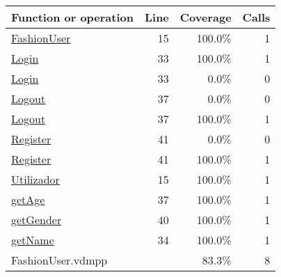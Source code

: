 \begin{longtable}{|l|r|r|r|}
\hline
Function or operation & Line & Coverage & Calls \\
\hline
\hline
\hyperref[FashionUser:15]{FashionUser} & 15&100.0\% & 1 \\
\hline
\hyperref[Login:33]{Login} & 33&100.0\% & 1 \\
\hline
\hyperref[Login:33]{Login} & 33&0.0\% & 0 \\
\hline
\hyperref[Logout:37]{Logout} & 37&0.0\% & 0 \\
\hline
\hyperref[Logout:37]{Logout} & 37&100.0\% & 1 \\
\hline
\hyperref[Register:41]{Register} & 41&0.0\% & 0 \\
\hline
\hyperref[Register:41]{Register} & 41&100.0\% & 1 \\
\hline
\hyperref[Utilizador:15]{Utilizador} & 15&100.0\% & 1 \\
\hline
\hyperref[getAge:37]{getAge} & 37&100.0\% & 1 \\
\hline
\hyperref[getGender:40]{getGender} & 40&100.0\% & 1 \\
\hline
\hyperref[getName:34]{getName} & 34&100.0\% & 1 \\
\hline
\hline
FashionUser.vdmpp & & 83.3\% & 8 \\
\hline
\end{longtable}

